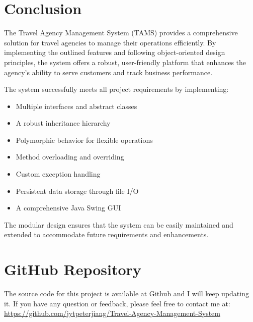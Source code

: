\documentclass[12pt]{article}
\begin{document}
\section{Conclusion}
The Travel Agency Management System (TAMS) provides a comprehensive solution for travel agencies to manage their operations efficiently. By implementing the outlined features and following object-oriented design principles, the system offers a robust, user-friendly platform that enhances the agency's ability to serve customers and track business performance.

The system successfully meets all project requirements by implementing:
\begin{itemize}
    \item Multiple interfaces and abstract classes
    \item A robust inheritance hierarchy
    \item Polymorphic behavior for flexible operations
    \item Method overloading and overriding
    \item Custom exception handling
    \item Persistent data storage through file I/O
    \item A comprehensive Java Swing GUI
\end{itemize}

The modular design ensures that the system can be easily maintained and extended to accommodate future requirements and enhancements.

\section*{GitHub Repository}
The source code for this project is available at Github and I will keep updating it. If you have any question or feedback, please feel free to contact me at:\\
\href{https://github.com/jytpeterjiang/Travel-Agency-Management-System}{https://github.com/jytpeterjiang/Travel-Agency-Management-System}
\end{document}
